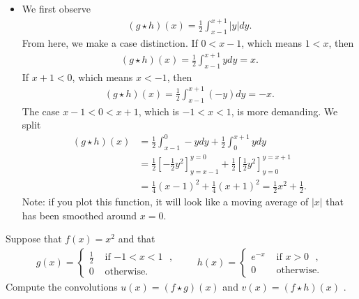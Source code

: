 \documentclass[11pt]{article}
\begin{document}
\begin{solution}
\begin{itemize}
        \item 
        We first observe 
        \begin{align*}
            ( g \star h )(x) = \frac 1 2 \int_{x-1}^{x+1} |y| dy.
        \end{align*}
        From here, we make a case distinction. 
        If $0 < x-1$, which means $1 < x$, then 
        \begin{align*}
            ( g \star h )(x) =   \frac 1 2 \int_{x-1}^{x+1}    y dy =  x.
        \end{align*}
        If $x+1 < 0$, which means $x < -1$, then 
        \begin{align*}
            ( g \star h )(x) =   \frac 1 2 \int_{x-1}^{x+1} (-y) dy = -x.
        \end{align*}
        The case $x-1 < 0 < x+1$, which is $-1 < x < 1$, is more demanding. We split 
        \begin{align*}
            ( g \star h )(x) 
            &= 
            \frac 1 2 \int_{x-1}^{  0} -y dy
            +
            \frac 1 2 \int_{  0}^{x+1}  y dy
            \\&
            =
            \frac 1 2 \left[ -\frac 1 2 y^{2}\right]_{y=x-1}^{y=  0}
            +
            \frac 1 2 \left[  \frac 1 2 y^{2}\right]_{y=  0}^{y=x+1}
            \\&
            =
            \frac 1 4 (x-1)^{2} 
            +
            \frac 1 4 (x+1)^{2} 
            =
            \frac 1 2 x^2 + \frac 1 2
            .
        \end{align*}
        Note: if you plot this function, it will look like a moving average of $|x|$ that has been smoothed around $x=0$.
    \end{itemize}
\end{solution}



\begin{exercise}
    Suppose that $f(x) = x^2$ and that
    \begin{align*}
        g(x) = \left\{\begin{array}{cc} \frac 1 2 & \text{ if $-1 < x < 1$ }, \\ 0 & \text{ otherwise. } \end{array}\right.
        \qquad 
        h(x) = \left\{\begin{array}{cc} e^{-x} & \text{ if $x > 0$ }, \\ 0 & \text{ otherwise. } \end{array}\right.
    \end{align*}
    Compute the convolutions $u(x) = (f \star g)(x)$ and $v(x) = (f \star h)(x)$ .
\end{exercise}
\end{document}
